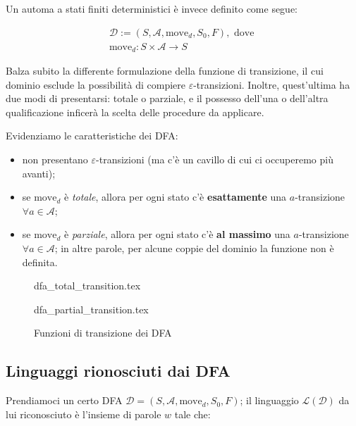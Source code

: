 \documentclass[class=book, crop=false, oneside, 12pt]{standalone}
\begin{document}
Un automa a stati finiti deterministici è invece definito come segue:

\begin{gather}
    \mathcal{D} := (S, \mathcal{A}, \textrm{move}_d, S_0, F), \textrm{ dove } \\
    \textrm{move}_d : S \times \mathcal{A} \to S
\end{gather}

Balza subito la differente formulazione della funzione di transizione, il cui dominio esclude la possibilità di compiere \(\varepsilon\)-transizioni. Inoltre, quest'ultima ha due modi di presentarsi: totale o parziale, e il possesso dell'una o dell'altra qualificazione inficerà la scelta delle procedure da applicare.

Evidenziamo le caratteristiche dei DFA:

\begin{itemize}
    \item non presentano \(\varepsilon\)-transizioni (ma c'è un cavillo di cui ci occuperemo più avanti);
    \item se \(\textrm{move}_d\) è \emph{totale}, allora per ogni stato c'è \textbf{esattamente} una \(a\)-transizione \(\forall a \in \mathcal{A}\);
    \item se \(\textrm{move}_d\) è \emph{parziale}, allora per ogni stato c'è \textbf{al massimo} una \(a\)-transizione \(\forall a \in \mathcal{A}\); in altre parole, per alcune coppie del dominio la funzione non è definita.
\end{itemize}

\begin{figure}[H]
    \begin{minipage}[b]{0.4\textwidth}
        \centering
        {dfa_total_transition.tex}
    \end{minipage}
    \hfill
    \begin{minipage}[b]{0.4\textwidth}
        \centering
        {dfa_partial_transition.tex}
    \end{minipage}
    \caption{Funzioni di transizione dei DFA}
\end{figure}

\subsection{Linguaggi rionosciuti dai DFA}
Prendiamoci un certo DFA \(\mathcal{D} = (S, \mathcal{A}, \textrm{move}_d, S_0, F)\); il linguaggio \(\mathcal{L(D)}\) da lui riconosciuto è l'insieme di parole \(w\) tale che:
\end{document}
